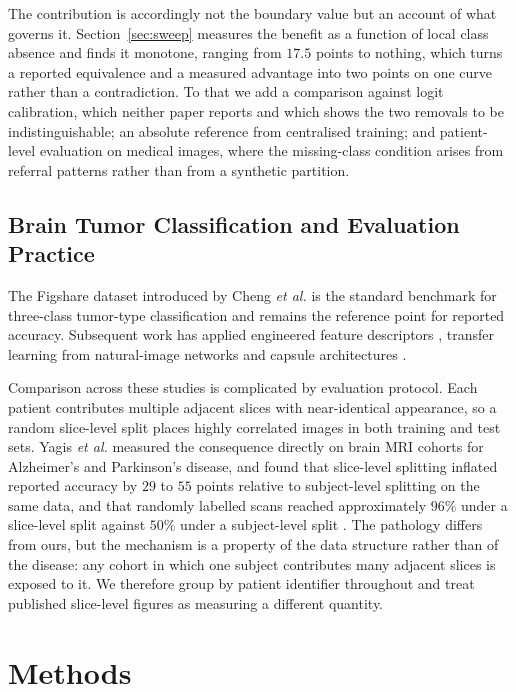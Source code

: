 \documentclass[journal]{IEEEtran}
\begin{document}
The contribution is accordingly not the boundary value but an account of what
governs it. Section~\ref{sec:sweep} measures the benefit as a function of local
class absence and finds it monotone, ranging from $17.5$ points to nothing, which
turns a reported equivalence and a measured advantage into two points on one
curve rather than a contradiction. To that we add a comparison against logit
calibration, which neither paper reports and which shows the two removals to be
indistinguishable; an absolute reference from centralised training; and
patient-level evaluation on medical images, where the missing-class condition
arises from referral patterns rather than from a synthetic partition.

\subsection{Brain Tumor Classification and Evaluation Practice}
The Figshare dataset introduced by Cheng \emph{et al.} \cite{cheng2015} is the
standard benchmark for three-class tumor-type classification and remains the
reference point for reported accuracy. Subsequent work has applied engineered
feature descriptors \cite{gumaei2019}, transfer learning from natural-image
networks \cite{deepak2019,swati2019} and capsule architectures
\cite{afshar2019}.

Comparison across these studies is complicated by evaluation protocol. Each
patient contributes multiple adjacent slices with near-identical appearance, so
a random slice-level split places highly correlated images in both training and
test sets. Yagis \emph{et al.} measured the consequence directly on brain MRI cohorts for
Alzheimer's and Parkinson's disease, and found that slice-level splitting
inflated reported accuracy by $29$ to $55$ points relative to subject-level
splitting on the same data, and that randomly labelled scans reached
approximately $96\%$ under a slice-level split against $50\%$ under a
subject-level split \cite{yagis2021}. The pathology differs from ours, but the
mechanism is a property of the data structure rather than of the disease: any
cohort in which one subject contributes many adjacent slices is exposed to it.
We therefore group by patient identifier throughout and treat published
slice-level figures as measuring a different quantity.

\section{Methods}
\end{document}
